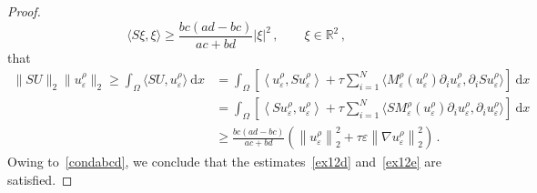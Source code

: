 \documentclass[AHL,Unicode,longabstracts,published]{cedram}
\newcommand{\bbR}{\mathbb{R}}
\newcommand{\rmd}{\mathrm{d}}
\begin{document}
\begin{proof}
\begin{equation*}
\langle S\xi,\xi\rangle \ge \frac{bc(ad-bc)}{ac+bd} |\xi|^2\,, \qquad \xi\in\bbR^2\,,
\end{equation*}
that
\begin{align*}
\|SU\|_2 \|u_\varepsilon^\rho\|_2 \ge \int_\Omega \langle SU, u_\varepsilon^\rho \rangle\ \rmd x & = \int_\Omega \left[\left\langle u_\varepsilon^\rho, S u_\varepsilon^\rho \right\rangle + \tau \sum_{i=1}^N\big\langle M_\varepsilon^\rho\left(u_\varepsilon^\rho\right) \partial_i u_\varepsilon^\rho, \partial_i S u_\varepsilon^\rho \big\rangle \right]\ \rmd x \\
& = \int_\Omega \left[\left\langle Su_\varepsilon^\rho, u_\varepsilon^\rho \right\rangle + \tau \sum_{i=1}^N\big\langle S M_\varepsilon^\rho\left(u_\varepsilon^\rho\right) \partial_i u_\varepsilon^\rho, \partial_i u_\varepsilon^\rho \big\rangle \right]\ \rmd x \\
& \ge \frac{bc(ad-bc)}{ac+bd} \left(\left\|u_\varepsilon^\rho\right\|_2^2 + \tau \varepsilon \left\|\nabla u_\varepsilon^\rho\right\|_2^2 \right)\,.
\end{align*}
Owing to~\eqref{condabcd}, we conclude that the estimates~\eqref{ex12d} and~\eqref{ex12e} are satisfied.


\end{proof}
\end{document}
